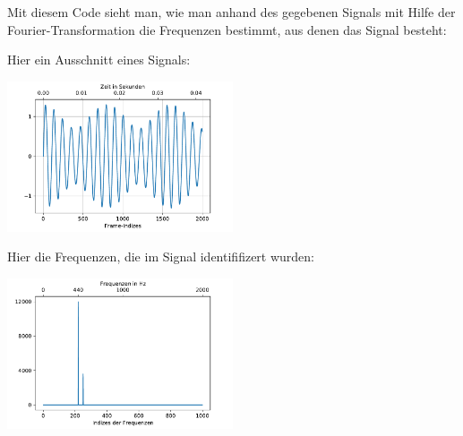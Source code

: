 \begin{bsp} Mit diesem Code sieht man, wie man anhand des gegebenen Signals mit Hilfe der Fourier-Transformation die Frequenzen bestimmt, aus denen das Signal besteht: 
 
Hier ein Ausschnitt eines Signals: 
\begin{center}
\includegraphics[width=0.5\textwidth]{code/combi_signal.pdf}
\end{center} 
Hier die Frequenzen, die im Signal identififizert wurden: 
\begin{center}
\includegraphics[width=0.5\textwidth]{code/combi_signal_fft.pdf}
\end{center} 
\end{bsp} 

